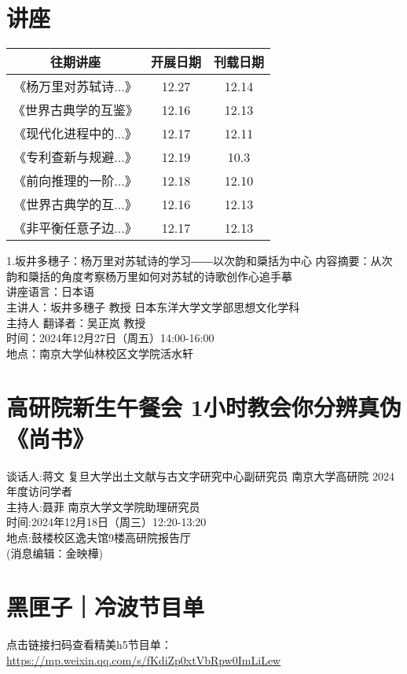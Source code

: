 \documentclass[letterpaper, 12pt]{article}
\begin{document}
\begin{multicols}{2}

\section{讲座}
\begin{tabular}{|c|c|c|}
    \hline
    往期讲座 & 开展日期 & 刊载日期\\
    \hline\hline
《杨万里对苏轼诗...》 & 12.27 & 12.14\\
《世界古典学的互鉴》 & 12.16 & 12.13\\
《现代化进程中的...》 & 12.17 & 12.11\\
《专利查新与规避...》 & 12.19 & 10.3\\
《前向推理的一阶...》 & 12.18 & 12.10\\
《世界古典学的互...》 & 12.16 & 12.13\\
《非平衡任意子边...》 & 12.17 & 12.13\\
    \hline
\end{tabular}

1.坂井多穗子：杨万里对苏轼诗的学习――以次韵和檃括为中心
内容摘要：从次韵和檃括的角度考察杨万里如何对苏轼的诗歌创作心追手摹\\
讲座语言：日本语\\
主讲人：坂井多穗子 教授 日本东洋大学文学部思想文化学科\\
主持人 翻译者：吴正岚 教授\\
时间：2024年12月27日（周五）14:00-16:00\\
地点：南京大学仙林校区文学院活水轩\\

\section{高研院新生午餐会 1小时教会你分辨真伪《尚书》}
谈话人:蒋文 复旦大学出土文献与古文字研究中心副研究员  南京大学高研院 2024年度访问学者\\
主持人:聂菲 南京大学文学院助理研究员\\
时间:2024年12月18日（周三）12:20-13:20\\
地点:鼓楼校区逸夫馆9楼高研院报告厅\\
(消息编辑：金映樺)

\section{黑匣子｜冷波节目单}
点击链接扫码查看精美h5节目单：\\
\url{https://mp.weixin.qq.com/s/fKdiZp0xtVbRpw0ImLiLew}\\


\end{multicols}
\end{document}
